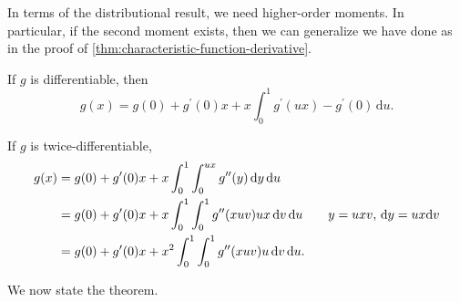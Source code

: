 In terms of the distributional result, we need higher-order moments. In particular, if the second moment exists, then we can generalize we have done as in the proof of \autoref{thm:characteristic-function-derivative}.

\begin{prev}
	If \(g\) is differentiable, then
	\[
		g(x)
		= g(0) + g^{\prime} (0) x + x \int_{0}^{1} g^{\prime} (ux) - g^{\prime} (0) \,\mathrm{d}u .
	\]
\end{prev}

\begin{note}\label{note:lec10}
	If \(g\) is twice-differentiable,
	\begin{align*}
		g(x)
		 & = g(0) + g^{\prime} (0) x + x \int_{0}^{1} \int_{0}^{ux} g^{\prime\prime} (y) \,\mathrm{d}y \,\mathrm{d} u                                                              \\
		 & = g(0) + g^{\prime} (0) x + x \int_{0}^{1} \int_{0}^{1} g^{\prime\prime} (xuv) ux \,\mathrm{d}v \,\mathrm{d} u  \tag*{\(y = ux v\), \(\mathrm{d} y = ux \mathrm{d} v\)} \\
		 & =  g(0) + g^{\prime} (0) x + x^2 \int_{0}^{1} \int_{0}^{1} g^{\prime\prime} (xuv) u \,\mathrm{d}v \,\mathrm{d} u.
	\end{align*}
\end{note}

We now state the theorem.

